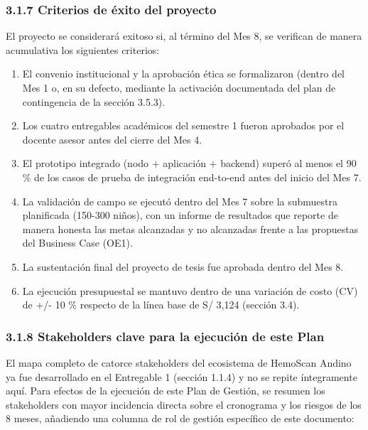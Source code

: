\documentclass[11pt,a4paper]{article}
\providecommand{\tightlist}{%
  \setlength{\itemsep}{0pt}\setlength{\parskip}{0pt}}
\begin{document}
\subsubsection{3.1.7 Criterios de éxito del proyecto}\label{criterios-de-uxe9xito-del-proyecto}

El proyecto se considerará exitoso si, al término del Mes 8, se verifican de manera acumulativa los siguientes criterios:

\begin{enumerate}
\def\labelenumi{\arabic{enumi}.}
\tightlist
\item
  El convenio institucional y la aprobación ética se formalizaron (dentro del Mes 1 o, en su defecto, mediante la activación documentada del plan de contingencia de la sección 3.5.3).
\item
  Los cuatro entregables académicos del semestre 1 fueron aprobados por el docente asesor antes del cierre del Mes 4.
\item
  El prototipo integrado (nodo + aplicación + backend) superó al menos el 90 \% de los casos de prueba de integración end-to-end antes del inicio del Mes 7.
\item
  La validación de campo se ejecutó dentro del Mes 7 sobre la submuestra planificada (150-300 niños), con un informe de resultados que reporte de manera honesta las metas alcanzadas y no alcanzadas frente a las propuestas del Business Case (OE1).
\item
  La sustentación final del proyecto de tesis fue aprobada dentro del Mes 8.
\item
  La ejecución presupuestal se mantuvo dentro de una variación de costo (CV) de +/- 10 \% respecto de la línea base de S/ 3,124 (sección 3.4).
\end{enumerate}

\subsubsection{3.1.8 Stakeholders clave para la ejecución de este Plan}\label{stakeholders-clave-para-la-ejecuciuxf3n-de-este-plan}

El mapa completo de catorce stakeholders del ecosistema de HemoScan Andino ya fue desarrollado en el Entregable 1 (sección 1.1.4) y no se repite íntegramente aquí. Para efectos de la ejecución de este Plan de Gestión, se resumen los stakeholders con mayor incidencia directa sobre el cronograma y los riesgos de los 8 meses, añadiendo una columna de rol de gestión específico de este documento:
\end{document}

